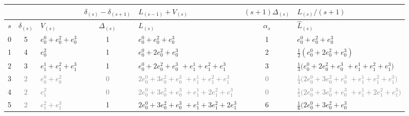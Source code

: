 \documentclass[11pt,a4paper]{article}
\newcommand{\eji}[2]{e^{#1}_{#2}}       %
\begin{document}
\begin{center}
\small
\setlength{\tabcolsep}{4pt}
\renewcommand{\arraystretch}{1.35}
\begin{tabular}{c|cp{3cm}|cp{3cm}|cp{3cm}}
\toprule
    &
    &
    & $\delta_{(s)}-\delta_{(s+1)}$
    & $L_{(s-1)}+V_{(s)}$
    & $(s+1)\Delta_{(s)}$
    & $L_{(s)}/(s+1)$\\
\midrule
$s$ & $\delta_{(s)}$
    & $V_{(s)}$
    & $\Delta_{(s)}$
    & $L_{(s)}$
    & $\alpha_s$
    & ${\hat L}_{(s)}$ \\
\midrule
0 & 5 & $\eji{0}{0}+\eji{2}{0}+\eji{3}{0}$ & 1
  & $\eji{0}{0}+\eji{2}{0}+\eji{3}{0}$
  & 1
  & $\eji{0}{0}+\eji{2}{0}+\eji{3}{0}$
  \\[3pt]
1 & 4 & $\eji{2}{0}$ & 1
  & $\eji{0}{0}+2\eji{2}{0}+\eji{3}{0}$
  & 2
  & $\tfrac 1 2 (\eji{0}{0}+2\eji{2}{0}+\eji{3}{0})$
 \\[3pt]
2 & 3 & $\eji{1}{1}+\eji{2}{1}+\eji{3}{1}$
& 1
  & $\eji{0}{0}+2\eji{2}{0}+\eji{3}{0}$\newline
    ${}+\eji{1}{1}+\eji{2}{1}+\eji{3}{1}$
    & 3
  & $\tfrac 1 3 (\eji{0}{0}+2\eji{2}{0}+\eji{3}{0}$\newline
    ${}+\eji{1}{1}+\eji{2}{1}+\eji{3}{1})$
   \\[3pt]
\rowcolor{gray!15}\cellcolor{white}3 & \textcolor{gray}{$2$} & \textcolor{gray}{$\eji{0}{0}+\eji{2}{0}$} & \textcolor{gray}{$0$}
  & \textcolor{gray}{$2\eji{0}{0}+3\eji{2}{0}+\eji{3}{0}$\newline
    ${}+\eji{1}{1}+\eji{2}{1}+\eji{3}{1}$}
    & \textcolor{gray}{$0$}
  & \textcolor{gray}{$\tfrac 1 4 (2\eji{0}{0}+3\eji{2}{0}+\eji{3}{0}$\newline
    ${}+\eji{1}{1}+\eji{2}{1}+\eji{3}{1})$}
   \\[3pt]
\rowcolor{gray!15}\cellcolor{white}4 & \textcolor{gray}{$2$} & \textcolor{gray}{$\eji{2}{1}$} & \textcolor{gray}{$0$}
  & \textcolor{gray}{$2\eji{0}{0}+3\eji{2}{0}+\eji{3}{0}$\newline
    ${}+\eji{1}{1}+2\eji{2}{1}+\eji{3}{1}$}
    & \textcolor{gray}{$0$}
  & \textcolor{gray}{$\tfrac 1 5 (2\eji{0}{0}+3\eji{2}{0}+\eji{3}{0}$\newline
    ${}+\eji{1}{1}+2\eji{2}{1}+\eji{3}{1})$}
    \\[3pt]
5 & \cellcolor{gray!15}\textcolor{gray}{$2$} & \cellcolor{gray!15}\textcolor{gray}{$\eji{2}{1}+\eji{3}{1}$} & 1
  & $2\eji{0}{0}+3\eji{2}{0}+\eji{3}{0}$\newline
    ${}+\eji{1}{1}+3\eji{2}{1}+2\eji{3}{1}$
    & 6
  & $\tfrac 1 6 (2\eji{0}{0}+3\eji{2}{0}+\eji{3}{0}$\newline

\end{tabular}
\end{center}
\end{document}
